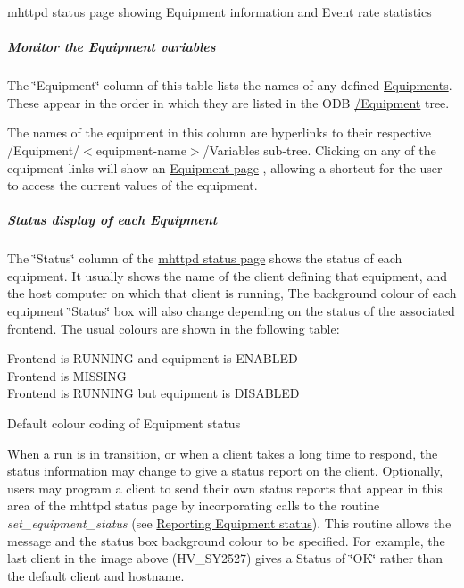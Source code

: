 \begin{center} mhttpd status page showing Equipment information and Event rate statistics  \end{center} \hypertarget{RC_mhttpd_status_page_features_RC_mhttpd_eq_variables}{}\subparagraph{Monitor the Equipment variables}\label{RC_mhttpd_status_page_features_RC_mhttpd_eq_variables}
The \char`\"{}Equipment\char`\"{} column of this table lists the names of any defined \hyperlink{FrontendOperation_FE_sw_equipment}{Equipments}. These appear in the order in which they are listed in the ODB \hyperlink{FE_ODB_equipment_tree}{/Equipment} tree.

The names of the equipment in this column are hyperlinks to their respective /Equipment/$<$equipment-\/name$>$/Variables sub-\/tree. Clicking on any of the equipment links will show an \hyperlink{RC_mhttpd_Equipment_page}{Equipment page} , allowing a shortcut for the user to access the current values of the equipment. \par


\par
\hypertarget{RC_mhttpd_status_page_features_RC_mhttpd_eq_status}{}\subparagraph{Status display of each Equipment}\label{RC_mhttpd_status_page_features_RC_mhttpd_eq_status}
The \char`\"{}Status\char`\"{} column of the \hyperlink{RC_mhttpd_status_page_features_RC_mhttpd_status_Equipment_info}{mhttpd status page} shows the status of each equipment. It usually shows the name of the client defining that equipment, and the host computer on which that client is running, The background colour of each equipment \char`\"{}Status\char`\"{} box will also change depending on the status of the associated frontend. The usual colours are shown in the following table:

\begin{center} \begin{table}[h]\begin{TabularC}{1}
\hline
Frontend is RUNNING and equipment is ENABLED  \\
Frontend is MISSING   \\
Frontend is RUNNING but equipment is DISABLED \\
\end{TabularC}
\centering
\caption{Default colour coding of Equipment status }
\end{table}
\par
 \end{center} 

When a run is in transition, or when a client takes a long time to respond, the status information may change to give a status report on the client. Optionally, users may program a client to send their own status reports that appear in this area of the mhttpd status page by incorporating calls to the routine {\itshape set\_\-equipment\_\-status\/} (see \hyperlink{FE_sequence_FE_frontend_status}{Reporting Equipment status}). This routine allows the message and the status box background colour to be specified. For example, the last client in the image above (HV\_\-SY2527) gives a Status of \char`\"{}OK\char`\"{} rather than the default client and hostname.

